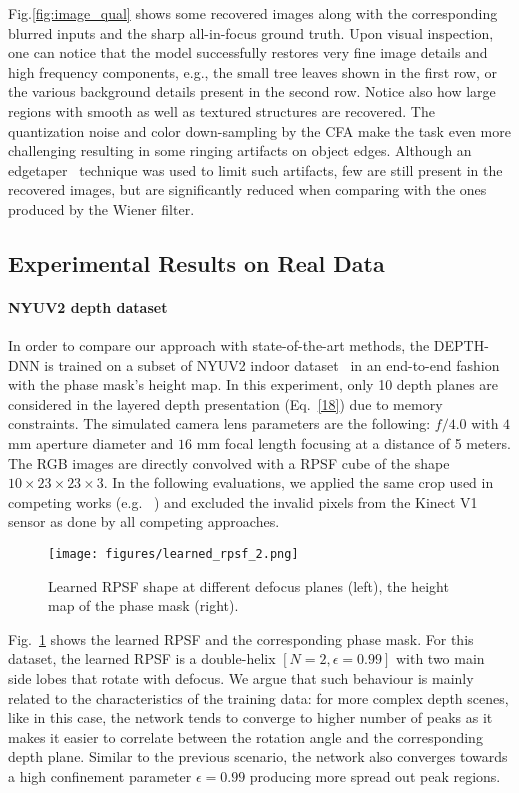 \documentclass[preprint,5p,twocolumn]{elsarticle}
\begin{document}
Fig.\ref{fig:image_qual} shows some recovered images along with the corresponding blurred inputs and the sharp all-in-focus ground truth. Upon visual inspection, one can notice that the model successfully restores very fine image details and high frequency components, e.g., the small tree leaves shown in the first row, or the various background details present in the second row. Notice also how large regions with smooth as well as textured structures are recovered. The quantization noise and color down-sampling by the CFA make the task even more challenging resulting in some ringing artifacts on object edges.
Although an edgetaper~\cite{reeves2005fast} technique was used to limit such artifacts, few are still present in the recovered images, but are significantly reduced when comparing with the ones produced by the Wiener filter. 

\subsection{Experimental Results on Real Data}


\paragraph{NYUV2 depth dataset}


In order to compare our approach with state-of-the-art methods, the DEPTH-DNN is trained on a subset of NYUV2 indoor dataset~\cite{eigen2014depth} in an end-to-end fashion with the phase mask's height map. In this experiment, only 10 depth planes are considered in the layered depth presentation (Eq.~\ref{18}) due to memory constraints. The simulated camera lens parameters are the following: $f/4.0$ with  $4$ mm aperture diameter and $16$ mm focal length focusing at a distance of 5 meters. The RGB images are directly convolved with a RPSF cube of the shape $10\times23\times23\times3$. 
In the following evaluations,  we applied the same crop used in competing works (e.g. ~\cite{eigen2015predicting}) and excluded the invalid pixels from the Kinect V1 sensor as done by all competing approaches. 

\begin{figure}[h!]
\centering
\texttt{[image: figures/learned\_rpsf\_2.png]}
\caption{Learned RPSF shape at different defocus planes (left), the height map of the phase mask (right).}
\label{fig:learndedrpsf2}
\end{figure}

Fig.~\ref{fig:learndedrpsf2} shows the learned RPSF and the corresponding phase mask. For this dataset, the learned RPSF is a double-helix $[N=2,\epsilon=0.99]$ with two main side lobes that rotate with defocus. We argue that such behaviour is mainly related to the characteristics of the training data: for more complex depth scenes, like in this case, the network tends to converge to higher number of peaks as it makes it easier to correlate between the rotation angle and the corresponding depth plane. Similar to the previous  scenario, the network also converges towards a high confinement parameter $\epsilon=0.99$ producing more spread out peak regions.   
\end{document}
